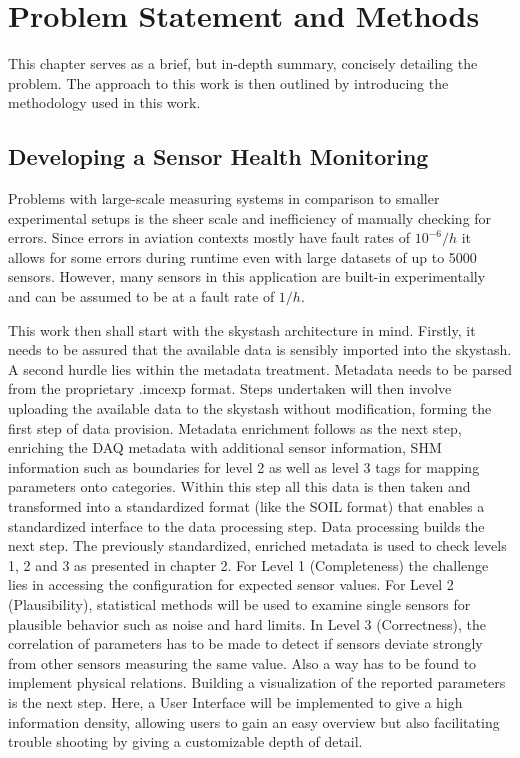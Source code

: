 \chapter{Problem Statement and Methods}

This chapter serves as a brief, but in-depth summary, concisely detailing the problem. The approach to this work is then outlined by introducing the methodology used in this work.

\section{Developing a Sensor Health Monitoring}

Problems with large-scale measuring systems in comparison to smaller experimental setups is the sheer scale and inefficiency of manually checking for errors. Since errors in aviation contexts mostly have fault rates of $10^{-6}/h$ it allows for some errors during runtime even with large datasets of up to 5000 sensors. However, many sensors in this application are built-in experimentally and can be assumed to be at a fault rate of $1/h$.

This work then shall start with the skystash architecture in mind. Firstly, it needs to be assured that the available data is sensibly imported into the skystash. A second hurdle lies within the metadata treatment. Metadata needs to be parsed from the proprietary .imcexp format. Steps undertaken will then involve uploading the available data to the skystash without modification, forming the first step of data provision.
Metadata enrichment follows as the next step, enriching the DAQ metadata with additional sensor information, SHM information such as boundaries for level 2 as well as level 3 tags for mapping parameters onto categories. Within this step all this data is then taken and transformed into a standardized format (like the SOIL format) that enables a standardized interface to the data processing step.
Data processing builds the next step. The previously standardized, enriched metadata is used to check levels 1, 2 and 3 as presented in chapter 2. For Level 1 (Completeness) the challenge lies in accessing the configuration for expected sensor values. For Level 2 (Plausibility), statistical methods will be used to examine single sensors for plausible behavior such as noise and hard limits. In Level 3 (Correctness), the correlation of parameters has to be made to detect if sensors deviate strongly from other sensors measuring the same value. Also a way has to be found to implement physical relations.
Building a visualization of the reported parameters is the next step. Here, a User Interface will be implemented to give a high information density, allowing users to gain an easy overview but also facilitating trouble shooting by giving a customizable depth of detail.

